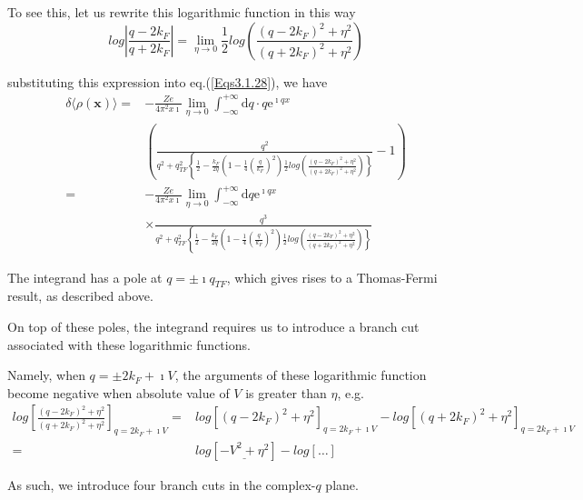 \begin{itemize}
To see this, let us rewrite this logarithmic function in this way
\begin{equation}\label{Eqs3.1.30}
log\left| \frac{q-2 k_F}{q+ 2k_F} \right| = \lim_{\eta \rightarrow 0} \frac{1}{2} log \left( \frac{(q-2 k_F)^2 + \eta^2}{(q + 2 k_F)^2 + \eta^2}\right)
\end{equation}

substituting this expression into eq.(\ref{Eqs3.1.28}), we have
\[\begin{split}
\delta \langle \rho(\mathbf{x}) \rangle =& -\frac{Z e}{4\pi^2 x \imath} \lim_{\eta \rightarrow 0} \int_{-\infty}^{+\infty} \mathrm{d} q \cdot q \mathrm{e}^{\imath q x}\\
& \left(  \frac{q^2}{q^2 + q_{TF}^2 \left\{\frac{1}{2}-\frac{k_F}{2q}\left( 1-\frac{1}{4}(\frac{q}{k_F})^2 \right) \frac{1}{2} log \left( \frac{(q-2 k_F)^2 + \eta^2}{(q + 2 k_F)^2 + \eta^2}\right) \right\}} -1 \right)\\
=& -\frac{Z e}{4\pi^2 x \imath} \lim_{\eta \rightarrow 0} \int_{-\infty}^{+\infty} \mathrm{d} q  \mathrm{e}^{\imath q x}\\
&\times \frac{q^3}{q^2 + q_{TF}^2 \left\{\frac{1}{2}-\frac{k_F}{2q}\left( 1-\frac{1}{4}(\frac{q}{k_F})^2 \right) \frac{1}{2} log \left( \frac{(q-2 k_F)^2 + \eta^2}{(q + 2 k_F)^2 + \eta^2}\right) \right\}}
\end{split}\]

The integrand has a pole at $q = \pm \imath q_{TF}$, which gives rises to a Thomas-Fermi result, as described above.

On top of these poles, the integrand requires us to introduce a branch cut associated with these logarithmic functions.

Namely, when $q=\pm 2 k_F + \imath V$, the arguments of these logarithmic function become negative when absolute value of $V$ is greater than $\eta$, e.g.
\begin{equation} \label{Eqs3.1.31} \begin{split}
log \left[ \frac{(q-2 k_F)^2 + \eta^2}{(q + 2 k_F)^2 + \eta^2}\right]_{q=2 k_F + \imath V} =& log \left[ (q-2 k_F)^2 + \eta^2 \right]_{q=2 k_F + \imath V}-log \left[ (q+2 k_F)^2 + \eta^2 \right]_{q=2 k_F + \imath V}\\
=& log\left[ \underline{-V^2 + \eta^2} \right] - log[\ldots]
\end{split}\end{equation}

As such, we introduce four branch cuts in the complex-$q$ plane.


\end{itemize}
